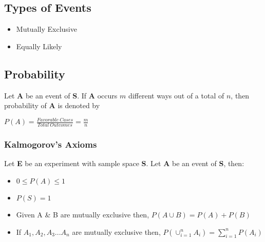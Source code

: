 \documentclass[./EngineeringMaths.tex]{subfiles}
\begin{document}
\subsection*{Types of Events}

\begin{itemize}
\item Mutually Exclusive
\item Equally Likely
\end{itemize}

\subsection{Probability}

Let \textbf{A} be an event of \textbf{S}. If \textbf{A} occurs $m$ different ways out of a total of $n$, then probability of \textbf{A} is denoted by 

\begin{center}
    $P(A) = \frac{Favorable\ Cases}{Total\ Outcomes} = \frac{m}{n}$
\end{center}

\subsubsection[Axioms on Probability]{Kalmogorov's Axioms}

Let \textbf{E} be an experiment with sample space \textbf{S}.
Let \textbf{A} be an event of \textbf{S}, then:

\begin{itemize}
\item $0 \leq P(A) \leq 1$ \label{th:1}
\item $P(S) = 1$ \label{th:2}
\item Given A \& B are mutually exclusive then, $P(A\cup B) = P(A) + P(B)$ \label{th:3}
\item If $A_1,A_2,A_3...A_n$ are mutually exclusive then, $P(\cup_{i=1}^n A_i) = \sum_{i=1}^n P(A_i)$ \label{th:4}
\end{itemize}
\end{document}
